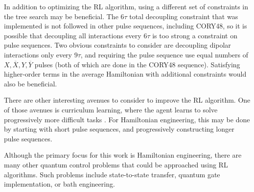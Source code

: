In addition to optimizing the RL algorithm, using a different set of constraints in the tree search may be beneficial. The $6\tau$ total decoupling constraint that was implemented is not followed in other pulse sequences, including CORY48, so it is possible that decoupling all interactions every $6\tau$ is too strong a constraint on pulse sequences. Two obvious constraints to consider are decoupling dipolar interactions only every $9\tau$, and requiring the pulse sequence use equal numbers of $X, \overline{X}, Y, \overline{Y}$ pulses (both of which are done in the CORY48 sequence). Satisfying higher-order terms in the average Hamiltonian with additional constraints would also be beneficial.

There are other interesting avenues to consider to improve the RL algorithm. One of those avenues is curriculum learning, where the agent learns to solve progressively more difficult tasks \cite{narvekar2020curriculum}. For Hamiltonian engineering, this may be done by starting with short pulse sequences, and progressively constructing longer pulse sequences.

Although the primary focus for this work is Hamiltonian engineering, there are many other quantum control problems that could be approached using RL algorithms. Such problems include state-to-state transfer, quantum gate implementation, or bath engineering.
